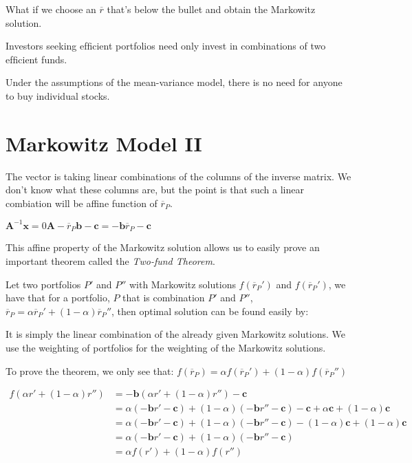 \begin{example}
What if we choose an $\overline{r}$ that's below the bullet and 
obtain the Markowitz solution.  
\end{example}

\frmrule

Investors seeking efﬁcient portfolios need only invest in
combinations of two efﬁcient funds.

Under the assumptions of the mean-variance model,
there is no need for anyone to buy individual stocks.


\section{Markowitz Model II}



The vector is taking linear combinations of 
the columns of the inverse matrix. We don't know what 
these columns are, but the point is that such a linear combiation 
will be affine function of $\overline{r}_P$. 

$\bm{A}^{-1} \bm{x} = 0\bm{A} - \overline{r}_P \bm{b} - \bm{c} = -\bm{b}\overline{r}_P - \bm{c}$

This affine property of the Markowitz solution allows us to easily 
prove an important theorem called the \textit{Two-fund Theorem}. 


Let two portfolios $P'$ and $P''$ with Markowitz solutions $f(\overline{r}_{P}')$ and $f(\overline{r}_{P}')$,
we have that for a portfolio, $P$ that is combination $P'$ and $P''$, 
$\overline{r}_{P} = \alpha \overline{r}_{P}' + (1 - \alpha) \overline{r}_{P}''$,
then optimal solution can be found easily by:


It is simply the linear combination of the already given Markowitz solutions.
We use the weighting of portfolios for the weighting of the Markowitz solutions. 

To prove the theorem, we only see that: 
$f(\overline{r}_{P}) = \alpha f(\overline{r}_{P}') + (1 - \alpha) f(\overline{r}_{P}'')$

\[
\begin{array}{ll}
f(\alpha r' + (1 - \alpha)r'') 
&= -\bm{b} (\alpha r' + (1-\alpha)r'') - \bm{c} \\
&=  \alpha (- \bm{b} r' - \bm{c}) + (1 - \alpha)(-\bm{b}r'' - \bm{c}) - \bm{c} + \alpha \bm{c} + (1-\alpha)\bm{c} \\
&=  \alpha (- \bm{b} r' - \bm{c}) + (1 - \alpha)(-\bm{b}r'' - \bm{c}) - (1-\alpha)\bm{c} + (1-\alpha)\bm{c}  \\
&=  \alpha (- \bm{b} r' - \bm{c}) + (1 - \alpha)(-\bm{b}r'' - \bm{c})  \\
&=  \alpha f(r') + (1 - \alpha)f(r'')  \\
\end{array}
\]


